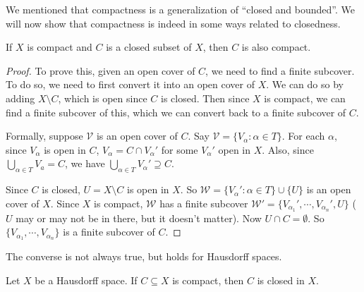 \documentclass[a4paper]{article}
\begin{document}
We mentioned that compactness is a generalization of ``closed and bounded''. We will now show that compactness is indeed in some ways related to closedness.
\begin{prop}
  If $X$ is compact and $C$ is a closed subset of $X$, then $C$ is also compact.
\end{prop}
\begin{proof}
  To prove this, given an open cover of $C$, we need to find a finite subcover. To do so, we need to first convert it into an open cover of $X$. We can do so by adding $X\setminus C$, which is open since $C$ is closed. Then since $X$ is compact, we can find a finite subcover of this, which we can convert back to a finite subcover of $C$.

  Formally, suppose $\mathcal{V}$ is an open cover of $C$. Say $\mathcal{V} = \{V_\alpha: \alpha \in T\}$. For each $\alpha$, since $V_\alpha$ is open in $C$, $V_\alpha = C\cap V_\alpha'$ for some $V_\alpha'$ open in $X$. Also, since $\bigcup_{\alpha \in T}V_a = C$, we have $\bigcup_{\alpha\in T}V_\alpha' \supseteq C$.

  Since $C$ is closed, $U = X \setminus C$ is open in $X$. So $\mathcal{W} = \{V_\alpha': \alpha \in T\} \cup \{U\}$ is an open cover of $X$. Since $X$ is compact, $\mathcal{W}$ has a finite subcover $\mathcal{W}' = \{V_{\alpha_1}', \cdots, V_{\alpha_n}', U\}$ ($U$ may or may not be in there, but it doesn't matter). Now $U\cap C = \emptyset$. So $\{V_{\alpha_1},\cdots, V_{\alpha_n}\}$ is a finite subcover of $C$.
\end{proof}

The converse is not always true, but holds for Hausdorff spaces.
\begin{prop}
  Let $X$ be a Hausdorff space. If $C\subseteq X$ is compact, then $C$ is closed in $X$.
\end{prop}
\end{document}
